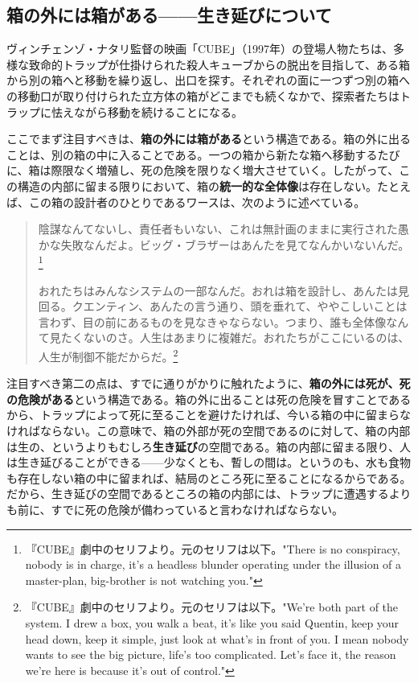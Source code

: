 \documentclass[b5j,twoside,twocolumn]{utarticle}
\begin{document}
\subsection{\tbaselineshift =3.0pt 箱の外には箱がある------生き延びについて}

ヴィンチェンゾ・ナタリ監督の映画「CUBE」（1997年）の登場人物たちは、多様な致命的トラップが仕掛けられた殺人キューブからの脱出を目指して、ある箱から別の箱へと移動を繰り返し、出口を探す。それぞれの面に一つずつ別の箱への移動口が取り付けられた立方体の箱がどこまでも続くなかで、探索者たちはトラップに怯えながら移動を続けることになる。

ここでまず注目すべきは、\textbf{箱の外には箱がある}という構造である。箱の外に出ることは、別の箱の中に入ることである。一つの箱から新たな箱へ移動するたびに、箱は際限なく増殖し、死の危険を限りなく増大させていく。したがって、この構造の内部に留まる限りにおいて、箱の\textbf{統一的な全体像}は存在しない。たとえば、この箱の設計者のひとりであるワースは、次のように述べている。

\begin{quotation}
陰謀なんてないし、責任者もいない、これは無計画のままに実行された愚かな失敗なんだよ。ビッグ・ブラザーはあんたを見てなんかいないんだ。\footnote{『CUBE』劇中のセリフより。元のセリフは以下。"There is no conspiracy, nobody is in charge, it's a headless blunder operating under the illusion of a master-plan, big-brother is not watching you."}

おれたちはみんなシステムの一部なんだ。おれは箱を設計し、あんたは見回る。クエンティン、あんたの言う通り、頭を垂れて、ややこしいことは言わず、目の前にあるものを見なきゃならない。つまり、誰も全体像なんて見たくないのさ。人生はあまりに複雑だ。おれたちがここにいるのは、人生が制御不能だからだ。\footnote{『CUBE』劇中のセリフより。元のセリフは以下。"We're both part of the system. I drew a box, you walk a beat, it's like you said Quentin, keep your head down, keep it simple, just look at what's in front of you. I mean nobody wants to see the big picture, life's too complicated. Let's face it, the reason we're here is because it's out of control."}
\end{quotation}

注目すべき第二の点は、すでに通りがかりに触れたように、\textbf{箱の外には死が、死の危険がある}という構造である。箱の外に出ることは死の危険を冒すことであるから、トラップによって死に至ることを避けたければ、今いる箱の中に留まらなければならない。この意味で、箱の外部が死の空間であるのに対して、箱の内部は生の、というよりもむしろ\textbf{生き延び}の空間である。箱の内部に留まる限り、人は生き延びることができる------少なくとも、暫しの間は。というのも、水も食物も存在しない箱の中に留まれば、結局のところ死に至ることになるからである。だから、生き延びの空間であるところの箱の内部には、トラップに遭遇するよりも前に、すでに死の危険が備わっていると言わなければならない。
\end{document}
